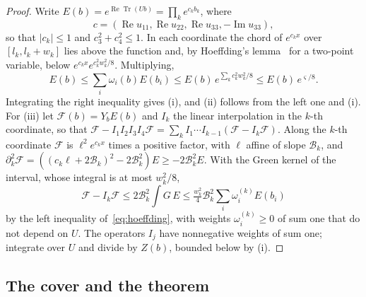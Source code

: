 \documentclass[11pt]{amsart}
\theoremstyle{definition}
\theoremstyle{remark}
\numberwithin{equation}{section}
\newcommand{\ReTr}{\operatorname{Re}\operatorname{Tr}}
\begin{document}
\begin{proof}
Write $E(b)=e^{\ReTr(Ub)}=\prod_ke^{c_kb_k}$, where
\[
c=(\operatorname{Re}u_{11},\operatorname{Re}u_{22},\operatorname{Re}u_{33},
-\operatorname{Im}u_{33}),
\]
so that $|c_k|\le1$ and $c_3^2+c_4^2\le1$. In each coordinate the chord of $e^{c_kx}$
over $[l_k,l_k+w_k]$ lies above the function and, by Hoeffding's
lemma~\cite{Hoe63} for a two-point variable, below $e^{c_kx}e^{c_k^2w_k^2/8}$.
Multiplying,
\begin{equation}\label{eq:hoeffding}
E(b)\le\sum_i\omega_i(b)E(b_i)\le E(b)\,e^{\sum_kc_k^2w_k^2/8}\le E(b)\,
e^{\varsigma/8}.
\end{equation}
Integrating the right inequality gives (i), and (ii) follows from the left
one and (i). For (iii) let $\mathcal F(b)=Y_bE(b)$ and $I_k$ the linear
interpolation in the $k$-th coordinate, so that $\mathcal F-I_1I_2I_3I_4
\mathcal F=\sum_kI_1\cdots I_{k-1}(\mathcal F-I_k\mathcal F)$. Along the $k$-th
coordinate $\mathcal F$ is $\ell^2e^{c_kx}$ times a positive factor, with $\ell$
affine of slope $\mathcal B_k$, and $\partial_k^2\mathcal F=((c_k\ell+2\mathcal
B_k)^2-2\mathcal B_k^2)E\ge-2\mathcal B_k^2E$. With the Green kernel of the
interval, whose integral is at most $w_k^2/8$,
\[
\mathcal F-I_k\mathcal F\le2\mathcal B_k^2\int G\,E\le\tfrac{w_k^2}4\mathcal
B_k^2\sum_i\omega_i^{(k)}E(b_i)
\]
by the left inequality of~\eqref{eq:hoeffding}, with weights $\omega_i^{(k)}
\ge0$ of sum one that do not depend on $U$. The operators $I_j$ have
nonnegative weights of sum one; integrate over $U$ and divide by $Z(b)$,
bounded below by (i).
\end{proof}

\subsection{The cover and the theorem}\label{ssec:cover}
\end{document}
